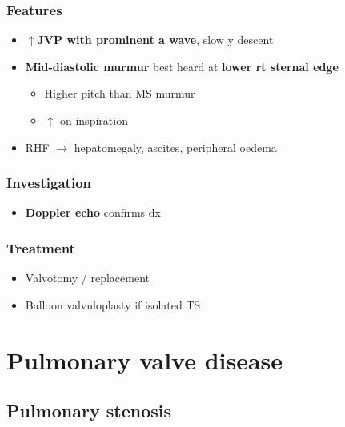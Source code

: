 \documentclass[
  12pt,
]{memoir}
\providecommand{\tightlist}{%
  \setlength{\itemsep}{0pt}\setlength{\parskip}{0pt}}
\begin{document}
\hypertarget{features-10}{%
\subsubsection{Features}\label{features-10}}

\begin{itemize}
\tightlist
\item
  \textbf{\(\boldsymbol\uparrow\)JVP with prominent a wave}, slow y
  descent
\item
  \textbf{Mid-diastolic murmur} best heard at \textbf{lower rt sternal
  edge}

  \begin{itemize}
  \tightlist
  \item
    Higher pitch than MS murmur
  \item
    \(\uparrow\) on inspiration
  \end{itemize}
\item
  RHF \(\rightarrow\) hepatomegaly, ascites, peripheral oedema
\end{itemize}

\hypertarget{investigation-13}{%
\subsubsection{Investigation}\label{investigation-13}}

\begin{itemize}
\tightlist
\item
  \textbf{Doppler echo} confirms dx
\end{itemize}

\hypertarget{treatment-4}{%
\subsubsection{Treatment}\label{treatment-4}}

\begin{itemize}
\tightlist
\item
  Valvotomy / replacement
\item
  Balloon valvuloplasty if isolated TS
\end{itemize}

\hypertarget{pulmonary-valve-disease}{%
\section{Pulmonary valve disease}\label{pulmonary-valve-disease}}

\hypertarget{pulmonary-stenosis}{%
\subsection{Pulmonary stenosis}\label{pulmonary-stenosis}}
\end{document}
